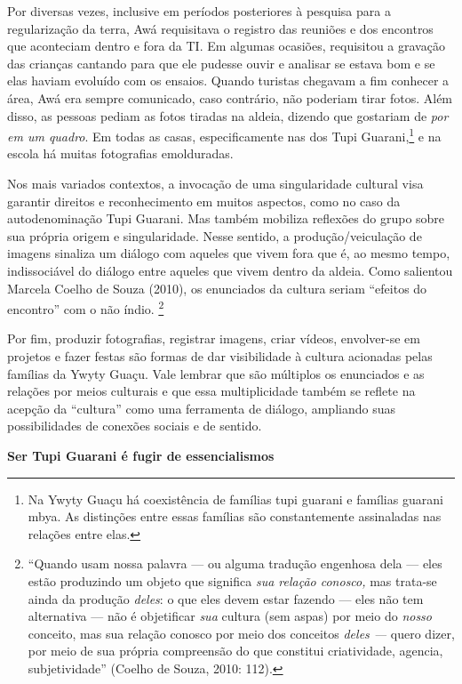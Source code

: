 Por diversas vezes, inclusive em períodos posteriores à pesquisa para a
regularização da terra, Awá requisitava o registro das reuniões e dos
encontros que aconteciam dentro e fora da TI. Em algumas ocasiões,
requisitou a gravação das crianças cantando para que ele pudesse ouvir e
analisar se estava bom e se elas haviam evoluído com os ensaios. Quando
turistas chegavam a fim conhecer a área, Awá era sempre comunicado, caso
contrário, não poderiam tirar fotos. Além disso, as pessoas pediam as
fotos tiradas na aldeia, dizendo que gostariam de \emph{por em um
quadro}. Em todas as casas, especificamente nas dos Tupi
Guarani,\footnote{Na Ywyty Guaçu há coexistência de famílias tupi
  guarani e famílias guarani mbya. As distinções entre essas famílias
  são constantemente assinaladas nas relações entre elas.} e na escola
há muitas fotografias emolduradas.

Nos mais variados contextos, a invocação de uma singularidade cultural
visa garantir direitos e reconhecimento em muitos aspectos, como no caso
da autodenominação Tupi Guarani. Mas também mobiliza reflexões do grupo
sobre sua própria origem e singularidade. Nesse sentido, a
produção/veiculação de imagens sinaliza um diálogo com aqueles que vivem
fora que é, ao mesmo tempo, indissociável do diálogo entre aqueles que
vivem dentro da aldeia. Como salientou Marcela Coelho de Souza (2010),
os enunciados da cultura seriam ``efeitos do encontro'' com o não índio.
\footnote{``Quando usam nossa palavra --- ou alguma tradução engenhosa
  dela --- eles estão produzindo um objeto que significa \emph{sua
  relação conosco,} mas trata-se ainda da produção \emph{deles}: o que
  eles devem estar fazendo --- eles não tem alternativa --- não é
  objetificar \emph{sua} cultura (sem aspas) por meio do \emph{nosso}
  conceito, mas sua relação conosco por meio dos conceitos \emph{deles
  ---} quero dizer, por meio de sua própria compreensão do que constitui
  criatividade, agencia, subjetividade'' (Coelho de Souza, 2010: 112).}

Por fim, produzir fotografias, registrar imagens, criar vídeos,
envolver-se em projetos e fazer festas são formas de dar visibilidade à
cultura acionadas pelas famílias da Ywyty Guaçu. Vale lembrar que são
múltiplos os enunciados e as relações por meios culturais e que essa
multiplicidade também se reflete na acepção da ``cultura'' como uma
ferramenta de diálogo, ampliando suas possibilidades de conexões sociais
e de sentido.

\textbf{Ser Tupi Guarani é fugir de essencialismos}

